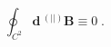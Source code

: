 \begin{equation}
\label{e5:27}
\oint_{C^2}{\mathbf d}{\,{}^{(||)}{\mathbf B}} \equiv 0 \; .
\end{equation}

